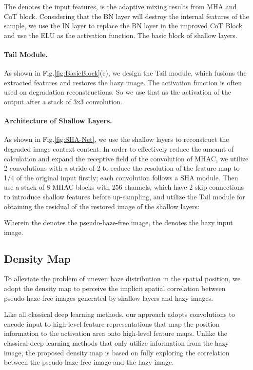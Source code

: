 \documentclass[final]{cvpr}
\begin{document}
The  denotes the input features,  is the adaptive mixing results from MHA and CoT block.
Considering that the BN layer will destroy the internal features of the sample, we use the IN layer to replace the BN layer in the improved CoT Block and use the ELU as the activation function. The basic block of shallow layers.


\paragraph{Tail Module.}
As shown in Fig.\ref{fig:BasicBlock}(c), we design the Tail module, which fusions the extracted features and restores the hazy image. The  activation function is often used on degradation reconstructions. So we use that as the activation of the output after a stack of 3x3 convolution.


\paragraph{Architecture of Shallow Layers.}
As shown in Fig.\ref{fig:SHA-Net}, we use the shallow layers to reconstruct the degraded image context content. In order to effectively reduce the amount of calculation and expand the receptive field of the convolution of MHAC, we utilize 2 convolutions with a stride of 2 to reduce the resolution of the feature map to 1/4 of the original input firstly; each convolution follows a SHA module. Then use a stack of 8 MHAC blocks with 256 channels, which have 2 skip connections to introduce shallow features before up-sampling, and utilize the Tail module for obtaining the residual of the restored image of the shallow layers:

Wherein the  denotes the pseudo-haze-free image, the  denotes the hazy input image.
\subsection{Density Map}


To alleviate the problem of uneven haze distribution in the spatial position, we adopt the density map to perceive the implicit spatial correlation between pseudo-haze-free images generated by shallow layers and hazy images. 

Like all classical deep learning methods, our approach adopts convolutions to encode input to high-level feature representations that map the position information to the activation area onto high-level feature maps. Unlike the classical deep learning methods that only utilize information from the hazy image, the proposed density map is based on fully exploring the correlation between the pseudo-haze-free image and the hazy image. 
\end{document}
